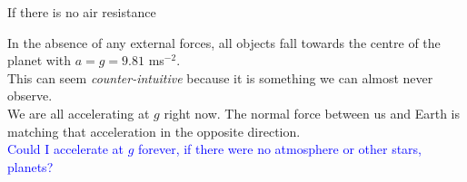 %
%
%
%
%
%






\begin{frame}{If there is no air resistance}

In the absence of any external forces, all objects fall towards the centre of the planet with $a = g =9.81$ ms$^{-2}$.\\[1ex]

This can seem \textit{counter-intuitive} because it is something we can almost never observe.\\[1ex]

We are all accelerating at $g$ right now. The normal force between us and Earth is matching that acceleration in the opposite direction.\\[1ex]

\textcolor{blue}{Could I accelerate at $g$ forever, if there were no atmosphere or other stars, planets?}\\[1ex]


\end{frame}



